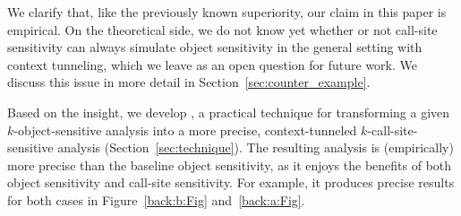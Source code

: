 
We clarify that, like the previously known superiority, our claim in this paper is empirical. 
On the theoretical side, we do not know yet whether or not call-site sensitivity can always simulate object sensitivity in the general setting with context tunneling, which we leave as an open question for future work. We discuss this issue in more detail in Section~\ref{sec:counter_example}.


\myparagraph{\ourtechnique}
Based on the insight, 
we develop \ourtechnique, a practical technique for transforming a given $k$-object-sensitive analysis 
into a more precise, context-tunneled $k$-call-site-sensitive analysis (Section~\ref{sec:technique}).  The
resulting analysis is (empirically) more precise than the baseline
object sensitivity, as it enjoys the benefits of both object
sensitivity and call-site sensitivity. For example, it
produces precise results for both cases in Figure~\ref{back:b:Fig} and~\ref{back:a:Fig}.


